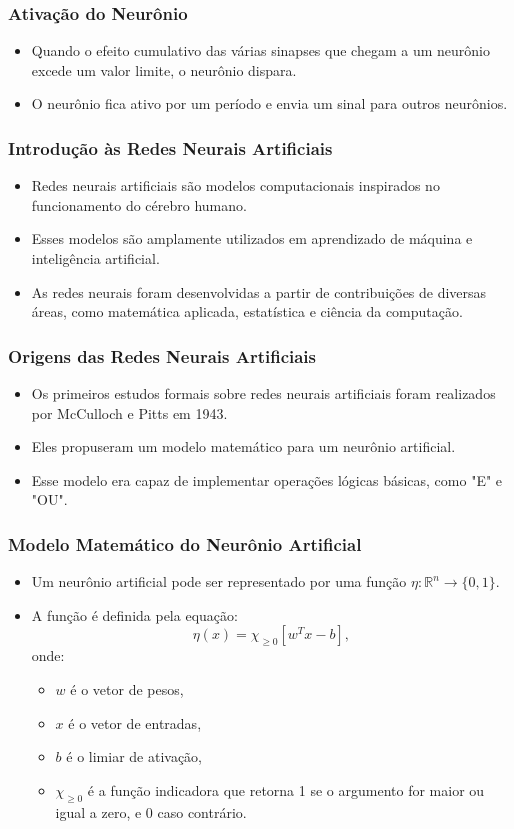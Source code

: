 \documentclass{beamer}
\begin{document}
\begin{frame}
\frametitle{Ativação do Neurônio}
\begin{itemize}
    \item Quando o efeito cumulativo das várias sinapses que chegam a um neurônio excede um valor limite, o neurônio dispara.
    \item O neurônio fica ativo por um período e envia um sinal para outros neurônios.
\end{itemize}
\end{frame}

\begin{frame}
\frametitle{Introdução às Redes Neurais Artificiais}
\begin{itemize}
    \item Redes neurais artificiais são modelos computacionais inspirados no funcionamento do cérebro humano.
    \item Esses modelos são amplamente utilizados em aprendizado de máquina e inteligência artificial.
    \item As redes neurais foram desenvolvidas a partir de contribuições de diversas áreas, como matemática aplicada, estatística e ciência da computação.
\end{itemize}
\end{frame}

\begin{frame}
\frametitle{Origens das Redes Neurais Artificiais}
\begin{itemize}
    \item Os primeiros estudos formais sobre redes neurais artificiais foram realizados por McCulloch e Pitts em 1943.
    \item Eles propuseram um modelo matemático para um neurônio artificial.
    \item Esse modelo era capaz de implementar operações lógicas básicas, como "E" e "OU".
\end{itemize}
\end{frame}

\begin{frame}
\frametitle{Modelo Matemático do Neurônio Artificial}
\begin{itemize}
    \item Um neurônio artificial pode ser representado por uma função \( \eta : \mathbb{R}^n \rightarrow \{0, 1\} \).
    \item A função é definida pela equação:
    \[
    \eta(x) = \chi_{\geq 0} \left[ w^T x - b \right],
    \]
    onde:
    \begin{itemize}
        \item \( w \) é o vetor de pesos,
        \item \( x \) é o vetor de entradas,
        \item \( b \) é o limiar de ativação,
        \item \( \chi_{\geq 0} \) é a função indicadora que retorna 1 se o argumento for maior ou igual a zero, e 0 caso contrário.
    \end{itemize}
\end{itemize}
\end{frame}
\end{document}
